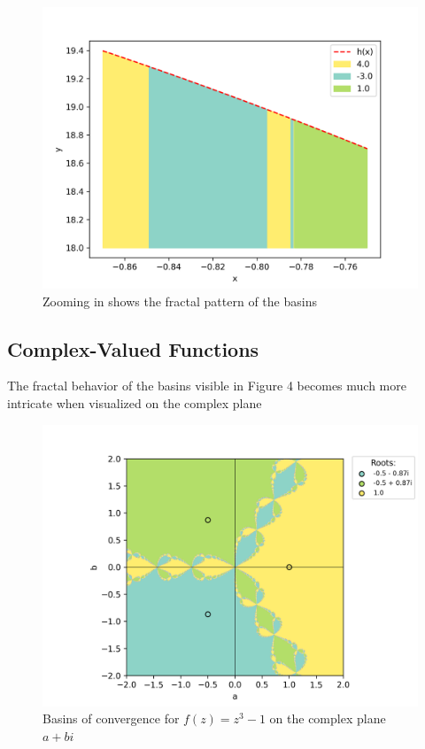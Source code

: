 \documentclass[10pt,a4paper]{article}
\begin{document}
		\begin{figure}[H]
			\caption{Zooming in shows the fractal pattern of the basins}
			\includegraphics[scale=0.75]{figure4}
		\end{figure}
	
		\subsection{Complex-Valued Functions}
		The fractal behavior of the basins visible in Figure 4 becomes much more intricate when visualized on the complex plane
		\begin{figure}[H]
			\caption{Basins of convergence for $f(z) = z^3 - 1$ on the complex plane $a+bi$}
			\includegraphics[scale=0.75]{figure5}
		\end{figure}
	
\end{document}
